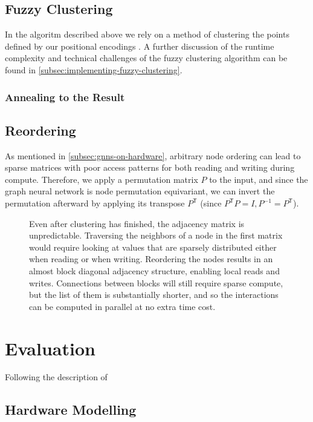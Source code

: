 \documentclass[../main.tex]{subfiles}
\begin{document}
    \subsection{Fuzzy Clustering}\label{subsec:fuzzy-clustering}
    In the algoritm described above we rely on a method of clustering the points defined by our positional encodings .
    A further discussion of the runtime complexity and technical challenges of the fuzzy clustering algorithm can be found in \autoref{subsec:implementing-fuzzy-clustering}.

    \subsubsection{Annealing to the Result}\label{subsubsec:annealing-to-the-result}


    \subsection{Reordering}\label{subsec:reordering}
    As mentioned in \autoref{subsec:gnns-on-hardware}, arbitrary node ordering can lead to sparse matrices with poor access patterns for both reading and writing during compute.
    Therefore, we apply a permutation matrix $P$ to the input, and since the graph neural network is node permutation equivariant, we can invert the permutation afterward by applying its transpose $P^\mathsf{T}$ (since $P^\mathsf{T} P = I, P^{-1} = P^\mathsf{T}$).

    \begin{figure}
        \centering
        
        \caption{Even after clustering has finished, the adjacency matrix is unpredictable.
        Traversing the neighbors of a node in the first matrix would require looking at values that are sparsely distributed either when reading or when writing.
        Reordering the nodes results in an almost block diagonal adjacency structure, enabling local reads and writes.
        Connections between blocks will still require sparse compute, but the list of them is substantially shorter, and so the interactions can be computed in parallel at no extra time cost.}
        \label{fig:block-diag-before-after}
    \end{figure}



    \section{Evaluation}\label{sec:evaluation}
    Following the description of

    \subsection{Hardware Modelling}\label{subsec:hardware-modelling}
\end{document}
